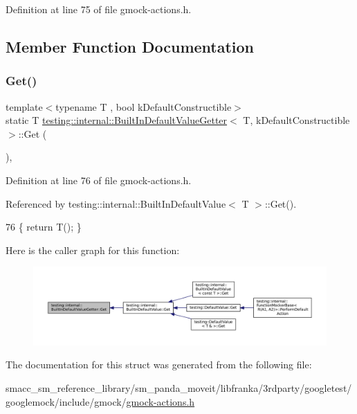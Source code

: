 Definition at line 75 of file gmock-\/actions.\+h.



\subsection{Member Function Documentation}
\mbox{\label{structtesting_1_1internal_1_1BuiltInDefaultValueGetter_a61c47c50cdb6ab488dabe2cec3b97fc8}} 
\subsubsection{\texorpdfstring{Get()}{Get()}}
{\footnotesize\ttfamily template$<$typename T , bool k\+Default\+Constructible$>$ \\
static T \hyperlink{structtesting_1_1internal_1_1BuiltInDefaultValueGetter}{testing\+::internal\+::\+Built\+In\+Default\+Value\+Getter}$<$ T, k\+Default\+Constructible $>$\+::Get (\begin{DoxyParamCaption}{ }\end{DoxyParamCaption})\hspace{0.3cm}{\ttfamily [inline]}, {\ttfamily [static]}}



Definition at line 76 of file gmock-\/actions.\+h.



Referenced by testing\+::internal\+::\+Built\+In\+Default\+Value$<$ T $>$\+::\+Get().


\begin{DoxyCode}
76 \{ \textcolor{keywordflow}{return} T(); \}
\end{DoxyCode}
Here is the caller graph for this function\+:
\nopagebreak
\begin{figure}[H]
\begin{center}
\leavevmode
\includegraphics[width=350pt]{structtesting_1_1internal_1_1BuiltInDefaultValueGetter_a61c47c50cdb6ab488dabe2cec3b97fc8_icgraph}
\end{center}
\end{figure}


The documentation for this struct was generated from the following file\+:\begin{DoxyCompactItemize}
\item 
smacc\+\_\+sm\+\_\+reference\+\_\+library/sm\+\_\+panda\+\_\+moveit/libfranka/3rdparty/googletest/googlemock/include/gmock/\hyperlink{gmock-actions_8h}{gmock-\/actions.\+h}\end{DoxyCompactItemize}

